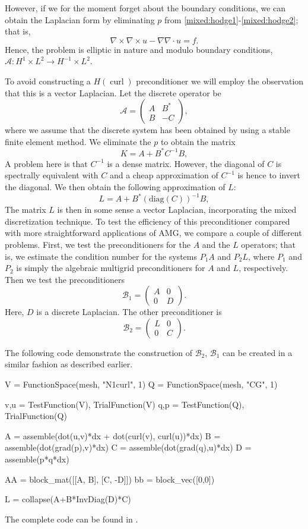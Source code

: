 However, if we for the moment forget about the boundary conditions,
we can obtain the Laplacian form  by eliminating $p$
from \eqref{mixed:hodge1}-\eqref{mixed:hodge2}; that is,
\[
\nabla \times \nabla \times u - \nabla \nabla \cdot u = f .
\]
Hence, the problem is elliptic
in nature and modulo boundary conditions,  $\mathcal{A}: H^1 \times L^2 \rightarrow  H^{-1} \times L^2$.

To avoid constructing a $H(\operatorname{curl})$ preconditioner we will employ
the observation that this is a vector Laplacian.
Let the discrete operator be
\[
\mathcal{A}  =
\begin{pmatrix} A & B^* \\ B & -C \end{pmatrix},
\]
where we assume that the discrete system has been obtained by using a stable finite
element method. We eliminate the $p$ to obtain the matrix
\[
K  = A +  B^* C^{-1} B,
\]
A problem here is that $C^{-1}$ is a dense matrix. However, the diagonal of $C$ is spectrally equivalent with $C$ and a cheap approximation of $C^{-1}$ is hence
to invert the diagonal. We then obtain the following approximation of $L$: 
\[
L  = A +  B^* (\mathrm{diag}(C))^{-1} B,
\]
The matrix $L$ is then in some sense a vector Laplacian,
incorporating the mixed discretization technique.  To test the
efficiency of this preconditioner compared with more straightforward
applications of AMG, we compare a couple of different problems.
First, we test the preconditioners for the $A$ and the $L$
operators; that is, we estimate the condition number for the systems
$P_1 A$ and $P_2 L$, where $P_1$ and $P_2$ is simply the algebraic
multigrid preconditioners for $A$ and $L$, respectively.  Then we
test the preconditioners
\[
\mathcal{B}_1  =
\begin{pmatrix} A & 0  \\ 0  & D \end{pmatrix}.
\]
Here, $D$ is a discrete Laplacian. The other preconditioner is
\[
\mathcal{B}_2  =
\begin{pmatrix} L & 0  \\ 0  & C \end{pmatrix}.
\]

The following code demonstrate the construction of $\mathcal{B}_2$,
$\mathcal{B}_1$ can be created in a similar fashion as described earlier.
\begin{python}
V = FunctionSpace(mesh, "N1curl", 1)
Q = FunctionSpace(mesh, "CG", 1)

v,u = TestFunction(V), TrialFunction(V)
q,p = TestFunction(Q), TrialFunction(Q)

A = assemble(dot(u,v)*dx + dot(curl(v), curl(u))*dx)
B = assemble(dot(grad(p),v)*dx)
C = assemble(dot(grad(q),u)*dx)
D = assemble(p*q*dx)

AA = block_mat([[A,  B],
                [C, -D]])
bb = block_vec([0,0])

L = collapse(A+B*InvDiag(D)*C)
\end{python}
The complete code can be found in .

